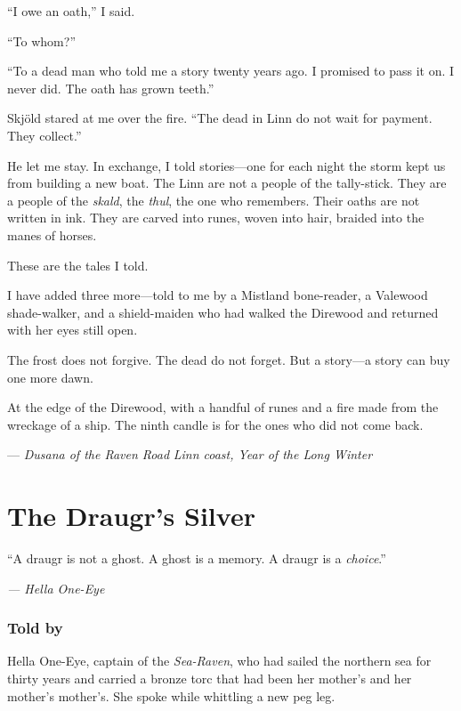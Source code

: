 \documentclass[9pt,a5paper]{extbook}
\begin{document}
``I owe an oath,'' I said.

``To whom?''

``To a dead man who told me a story twenty years ago. I promised to pass it on. I never did. The oath has grown teeth.''

Skjöld stared at me over the fire. ``The dead in Linn do not wait for payment. They collect.''

He let me stay. In exchange, I told stories---one for each night the storm kept us from building a new boat. The Linn are not a people of the tally-stick. They are a people of the \textit{skald}, the \textit{thul}, the one who remembers. Their oaths are not written in ink. They are carved into runes, woven into hair, braided into the manes of horses.

These are the tales I told.

I have added three more---told to me by a Mistland bone-reader, a Valewood shade-walker, and a shield-maiden who had walked the Direwood and returned with her eyes still open.

The frost does not forgive. The dead do not forget. But a story---a story can buy one more dawn.

At the edge of the Direwood, with a handful of runes and a fire made from the wreckage of a ship. The ninth candle is for the ones who did not come back.

\hfill --- \textit{Dusana of the Raven Road}
\vspace{0.5cm}
\hfill \textit{Linn coast, Year of the Long Winter}

\clearpage

\tableofcontents
\clearpage

\mainmatter


\chapter{The Draugr's Silver}

\epigraph{``A draugr is not a ghost. A ghost is a memory. A draugr is a \textit{choice}.''}{\textit{--- Hella One-Eye}}

\subsection*{Told by}

Hella One-Eye, captain of the \textit{Sea-Raven}, who had sailed the northern sea for thirty years and carried a bronze torc that had been her mother's and her mother's mother's. She spoke while whittling a new peg leg.
\end{document}
